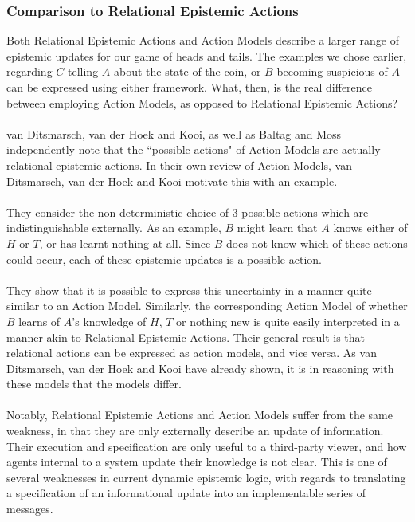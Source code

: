 \documentclass[12pt, a4paper, twoside]{article}
\begin{document}
\subsubsection{Comparison to Relational Epistemic Actions} \label{epi_compare}
Both Relational Epistemic Actions and Action Models describe a larger range of
epistemic updates for our game of heads and tails.
The examples we chose earlier, regarding $C$ telling $A$ about the state of the
coin, or $B$ becoming suspicious of $A$ can be expressed using either framework.
What, then, is the real difference between employing Action Models, as opposed
to Relational Epistemic Actions?\\
\\
van Ditsmarsch, van der Hoek and Kooi, as well as Baltag and Moss independently
note that the ``possible actions" of Action Models  are actually relational
epistemic actions.
In their own review of Action Models, van Ditsmarsch, van der Hoek and Kooi
motivate this with an example. \citep{hoek2008dynamic,baltag2005programs}\\
\\
They consider the non-deterministic choice of 3 possible actions which are
indistinguishable externally.
As an example, $B$ might learn that $A$ knows either of $H$ or $T$, or has
learnt nothing at all.
Since $B$ does not know which of these actions could occur, each of these
epistemic updates is a possible action.\\
\\
They show that it is possible to express this uncertainty in a manner quite similar
to an Action Model.
Similarly, the corresponding Action Model of whether $B$ learns of $A$'s
knowledge of $H$, $T$ or nothing new is quite easily interpreted in a manner
akin to Relational Epistemic Actions.
Their general result is that relational actions can be expressed as action
models, and vice versa.
As van Ditsmarsch, van der Hoek and Kooi have already shown, it is in reasoning
with these models that the models differ.\\
\\
Notably, Relational Epistemic Actions and Action Models suffer from the same
weakness, in that they are only externally describe an update of information.
Their execution and specification are only useful to a third-party viewer, and
how agents internal to a system update their knowledge is not clear.
This is one of several weaknesses in current dynamic epistemic logic, with
regards to translating a specification of an informational update into an
implementable series of messages.\\
\end{document}
